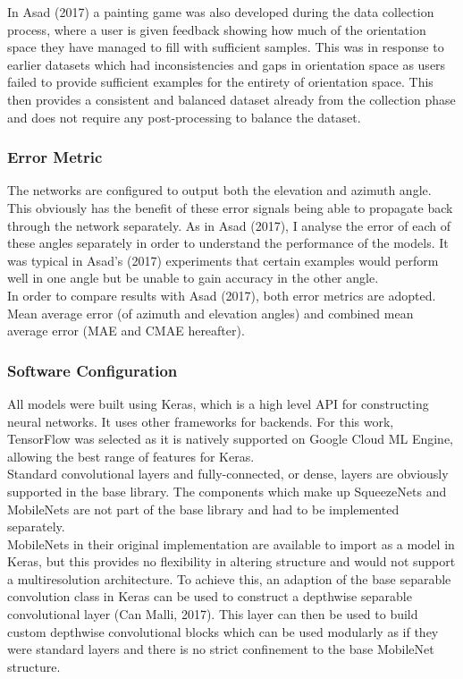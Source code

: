 \documentclass{article}
\begin{document}
{In Asad (2017) a painting game was also developed during the data collection process, where a user is given feedback showing how much of the orientation space they have managed to fill with sufficient samples. This was in response to earlier datasets which had inconsistencies and gaps in orientation space as users failed to provide sufficient examples for the entirety of orientation space. This then provides a consistent and balanced dataset already from the collection phase and does not require any post-processing to balance the dataset.

\subsubsection{Error Metric}
The networks are configured to output both the elevation and azimuth angle. This obviously has the benefit of these error signals being able to propagate back through the network separately. As in Asad (2017), I analyse the error of each of these angles separately in order to understand the performance of the models. It was typical in Asad's (2017) experiments that certain examples would perform well in one angle but be unable to gain accuracy in the other angle.\\

In order to compare results with Asad (2017), both error metrics are adopted. Mean average error (of azimuth and elevation angles) and combined mean average error (MAE and CMAE hereafter).

\subsubsection{Software Configuration}
All models were built using Keras, which is a high level API for constructing neural networks. It uses other frameworks for backends. For this work, TensorFlow was selected as it is natively supported on Google Cloud ML Engine, allowing the best range of features for Keras. \\

Standard convolutional layers and fully-connected, or dense, layers are obviously supported in the base library. The components which make up SqueezeNets and MobileNets are not part of the base library and had to be implemented separately. \\ 

MobileNets in their original implementation are available to import as  a model in Keras, but this provides no flexibility in altering structure and would not support a multiresolution architecture. To achieve this, an adaption of the base separable convolution class in Keras can be used to construct a depthwise separable convolutional layer (Can Malli, 2017). This layer can then be used to build custom depthwise convolutional blocks which can be used modularly as if they were standard layers and there is no strict confinement to the base MobileNet structure. \\

}
\end{document}

